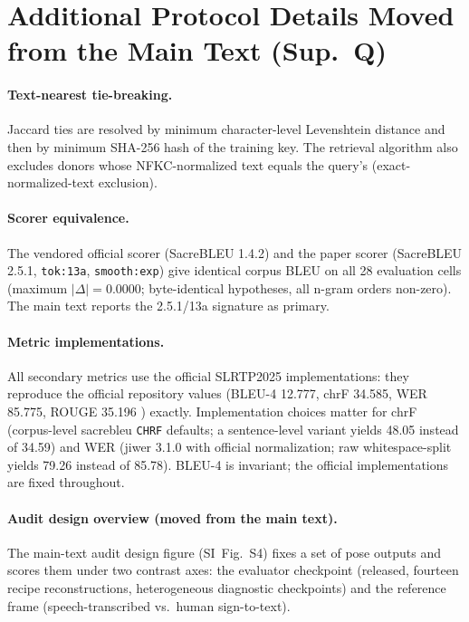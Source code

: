 \documentclass[pdflatex,sn-chicago]{sn-jnl}
\begin{document}
\section{Additional Protocol Details Moved from the Main Text (Sup.~Q)}
\label{sec:appendix_moved_protocol}
\paragraph{Text-nearest tie-breaking.}
Jaccard ties are resolved by minimum character-level Levenshtein distance and then by minimum SHA-256 hash of the training key. The retrieval algorithm also excludes donors whose NFKC-normalized text equals the query's (exact-normalized-text exclusion).

\paragraph{Scorer equivalence.}
The vendored official scorer (SacreBLEU 1.4.2) and the paper scorer (SacreBLEU 2.5.1, \texttt{tok:13a}, \texttt{smooth:exp}) give identical corpus BLEU on all 28 evaluation cells (maximum $|\Delta|=0.0000$; byte-identical hypotheses, all n-gram orders non-zero). The main text reports the 2.5.1/13a signature as primary.

\paragraph{Metric implementations.}
All secondary metrics use the official SLRTP2025 implementations: they reproduce the official repository values (BLEU-4 12.777, chrF 34.585, WER 85.775, ROUGE 35.196 \cite{slrtp2025}) exactly. Implementation choices matter for chrF (corpus-level sacrebleu \texttt{CHRF} defaults; a sentence-level variant yields 48.05 instead of 34.59) and WER (jiwer 3.1.0 with official normalization; raw whitespace-split yields 79.26 instead of 85.78). BLEU-4 is invariant; the official implementations are fixed throughout.

\paragraph{Audit design overview (moved from the main text).}
The main-text audit design figure (SI~Fig.~S4) fixes a set of pose outputs and scores them under two contrast axes: the evaluator checkpoint (released, fourteen recipe reconstructions, heterogeneous diagnostic checkpoints) and the reference frame (speech-transcribed vs.\ human sign-to-text).
\end{document}

